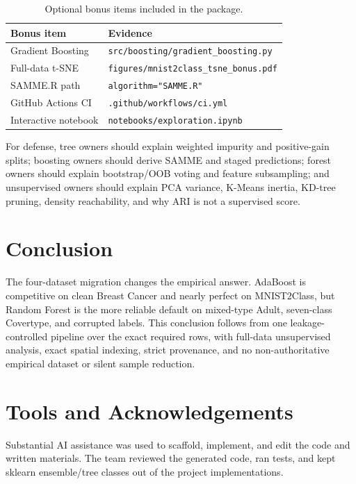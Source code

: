 \documentclass[conference]{IEEEtran}
\begin{document}
\begin{table}[t]
\centering
\caption{Optional bonus items included in the package.}
\label{tab:bonus}
\begin{tabular}{ll}
\toprule
Bonus item & Evidence \\
\midrule
Gradient Boosting & \texttt{src/boosting/gradient\_boosting.py} \\
Full-data t-SNE & \texttt{figures/mnist2class\_tsne\_bonus.pdf} \\
SAMME.R path & \texttt{algorithm="SAMME.R"} \\
GitHub Actions CI & \texttt{.github/workflows/ci.yml} \\
Interactive notebook & \texttt{notebooks/exploration.ipynb} \\
\bottomrule
\end{tabular}
\end{table}

For defense, tree owners should explain weighted impurity and positive-gain
splits; boosting owners should derive SAMME and staged predictions; forest
owners should explain bootstrap/OOB voting and feature subsampling; and
unsupervised owners should explain PCA variance, K-Means inertia, KD-tree
pruning, density reachability, and why ARI is not a supervised score.

\section{Conclusion}
The four-dataset migration changes the empirical answer. AdaBoost is
competitive on clean Breast Cancer and nearly perfect on MNIST2Class, but
Random Forest is the more reliable default on mixed-type Adult, seven-class
Covertype, and corrupted labels. This conclusion follows from one
leakage-controlled pipeline over the exact required rows, with full-data
unsupervised analysis, exact spatial indexing, strict provenance, and no
non-authoritative empirical dataset or silent sample reduction.

\section*{Tools and Acknowledgements}
Substantial AI assistance was used to scaffold, implement, and edit the code
and written materials. The team reviewed the generated code, ran tests, and
kept sklearn ensemble/tree classes out of the project implementations.
\end{document}
